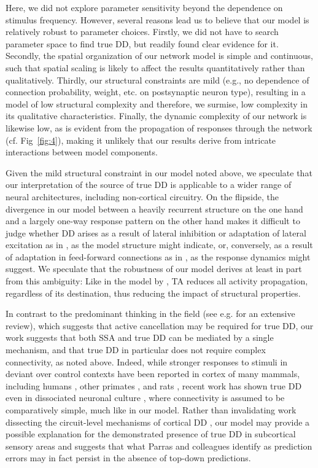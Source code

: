 \documentclass[10pt,letterpaper]{article}
\newcommand{\FIG}[1]{Fig~\ref{fig:#1}}
\begin{document}
Here, we did not explore parameter sensitivity beyond the dependence on stimulus frequency. However, several reasons lead us to believe that our model is relatively robust to parameter choices. Firstly, we did not have to search parameter space to find true DD, but readily found clear evidence for it. Secondly, the spatial organization of our network model is simple and continuous, such that spatial scaling is likely to affect the results quantitatively rather than qualitatively. Thirdly, our structural constraints are mild (e.g., no dependence of connection probability, weight, etc. on postsynaptic neuron type), resulting in a model of low structural complexity and therefore, we surmise, low complexity in its qualitative characteristics. Finally, the dynamic complexity of our network is likewise low, as is evident from the propagation of responses through the network (cf. \FIG{4}), making it unlikely that our results derive from intricate interactions between model components.

Given the mild structural constraint in our model noted above, we speculate that our interpretation of the source of true DD is applicable to a wider range of neural architectures, including non-cortical circuitry. On the flipside, the divergence in our model between a heavily recurrent structure on the one hand and a largely one-way response pattern on the other hand makes it difficult to judge whether DD arises as a result of lateral inhibition or adaptation of lateral excitation as in \cite{Yarden2017-eh, Hertag2020-kc, Park2020-oa}, as the model structure might indicate, or, conversely, as a result of adaptation in feed-forward connections as in \cite{Mill2011-ah}, as the response dynamics might suggest. We speculate that the robustness of our model derives at least in part from this ambiguity: Like in the model by \cite{May2015-lt}, TA reduces all activity propagation, regardless of its destination, thus reducing the impact of structural properties.

In contrast to the predominant thinking in the field (see e.g. \cite{Ross2020-qf} for an extensive review), which suggests that active cancellation may be required for true DD, our work suggests that both SSA and true DD can be mediated by a single mechanism, and that true DD in particular does not require complex connectivity, as noted above. Indeed, while stronger responses to stimuli in deviant over control contexts have been reported in cortex of many mammals, including humans \cite{Tada2019-lj}, other primates \cite{Takaura2016-eh}, and rats \cite{Taaseh2011-gg, Shiramatsu2013-qz, Harms2014-ah}, recent work has shown true DD even in dissociated neuronal culture \cite{Kubota2021-dx}, where connectivity is assumed to be comparatively simple, much like in our model. Rather than invalidating work dissecting the circuit-level mechanisms of cortical DD \cite{Hamm2016-lm, Attinger2017-dw, Yarden2022-yy}, our model may provide a possible explanation for the demonstrated presence of true DD in subcortical sensory areas \cite{Parras2017-fp} and suggests that what Parras and colleagues identify as prediction errors may in fact persist in the absence of top-down predictions.
\end{document}
